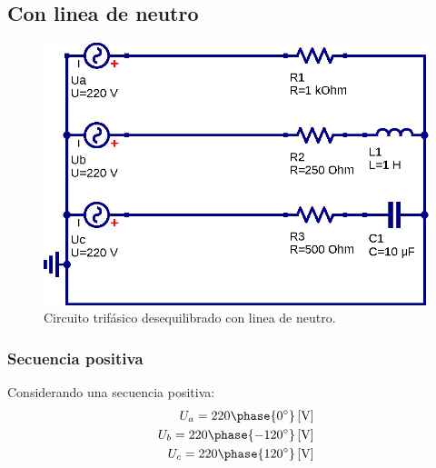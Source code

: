 \documentclass[letter,11pt]{article}
\begin{document}
\subsection{Con linea de neutro}
\begin{figure}[!h]
\centering
\includegraphics[scale=0.9]{figura2.eps}
\caption{Circuito trifásico desequilibrado con linea de neutro.}
\label{simulacion1}
\end{figure}

\subsubsection{Secuencia positiva}
Considerando una secuencia positiva:
\begin{equation*}
    \begin{split}
        U_a = 220\phase{0^{\circ}}\,[\text{V}]\\
        U_b = 220\phase{-120^{\circ}}\,[\text{V}]\\
        U_c = 220\phase{120^{\circ}}\,[\text{V}]\\
    \end{split}
\end{equation*}
\end{document}
